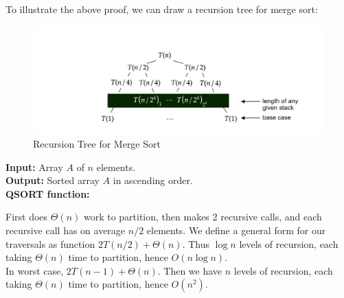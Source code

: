 \newpage

\noindent
To illustrate the above proof, we can draw a recursion tree for merge sort:\\
\vspace{-5em}
\begin{figure}[h]
    \hspace{-12em}
    \includegraphics[width=1.5\textwidth]{sections/modules/recursive_evaluation/rec_tree.png}
    \caption{Recursion Tree for Merge Sort}
\end{figure}

\vspace{-1em}
\begin{Func}
    \textbf{Input:} Array $A$ of $n$ elements.\\
    \textbf{Output:} Sorted array $A$ in ascending order.\\

    \vspace{-.5em}
    \noindent
    \textbf{QSORT function:}\\
    \begin{algorithm}[H]
        \label{algo:quicksort}
    \end{algorithm}
\end{Func}

\vspace{-1em}
\noindent
\begin{Proof}

    First does $\Theta(n)$ work to partition, then makes 2 recursive calls, and each recursive call 
    has on average $n/2$ elements. We define a general form for our traversals as function $2T(n/2) + \Theta(n)$.
    Thus $\log n$ levels of recursion, each taking $\Theta(n)$ time to partition, hence $O(n \log n)$.\\

    \noindent
    In worst case, $2T(n-1) + \Theta(n)$. Then we have $n$ levels of recursion, each taking $\Theta(n)$ time to partition, hence $O(n^2)$.

\end{Proof}

